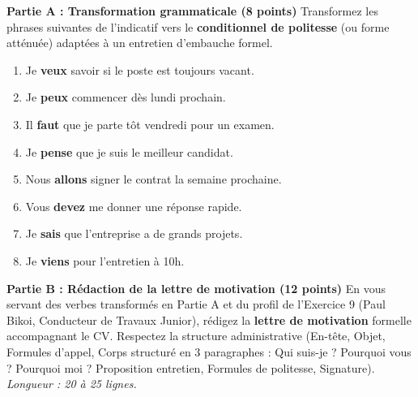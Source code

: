 \documentclass[11pt]{article}
\begin{document}
\begin{exercice}
\textbf{Partie A : Transformation grammaticale (8 points)}
Transformez les phrases suivantes de l'indicatif vers le \textbf{conditionnel de politesse} (ou forme atténuée) adaptées à un entretien d'embauche formel.
\begin{enumerate}
    \item Je \textbf{veux} savoir si le poste est toujours vacant.
    \item Je \textbf{peux} commencer dès lundi prochain.
    \item Il \textbf{faut} que je parte tôt vendredi pour un examen.
    \item Je \textbf{pense} que je suis le meilleur candidat.
    \item Nous \textbf{allons} signer le contrat la semaine prochaine.
    \item Vous \textbf{devez} me donner une réponse rapide.
    \item Je \textbf{sais} que l'entreprise a de grands projets.
    \item Je \textbf{viens} pour l'entretien à 10h.
\end{enumerate}

\textbf{Partie B : Rédaction de la lettre de motivation (12 points)}
En vous servant des verbes transformés en Partie A et du profil de l'Exercice 9 (Paul Bikoi, Conducteur de Travaux Junior), rédigez la \textbf{lettre de motivation} formelle accompagnant le CV. Respectez la structure administrative (En-tête, Objet, Formules d'appel, Corps structuré en 3 paragraphes : Qui suis-je ? Pourquoi vous ? Pourquoi moi ? Proposition entretien, Formules de politesse, Signature). \textit{Longueur : 20 à 25 lignes.}
\end{exercice}
\end{document}
